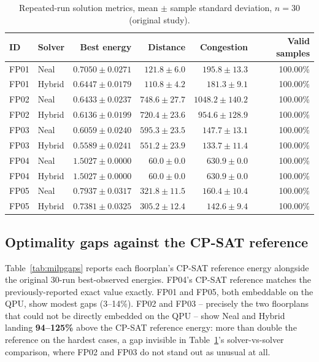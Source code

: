 \documentclass[11pt]{article}
\begin{document}
\begin{table}[h]
\centering
\caption{Repeated-run solution metrics, mean $\pm$ sample standard deviation, $n=30$ (original study).}
\label{tab:meanquality}
\small
\begin{tabular}{llrrrr}
\toprule
ID & Solver & Best energy & Distance & Congestion & Valid samples \\
\midrule
FP01 & Neal & $0.7050 \pm 0.0271$ & $121.8 \pm 6.0$ & $195.8 \pm 13.3$ & 100.00\% \\
FP01 & Hybrid & $0.6447 \pm 0.0179$ & $110.8 \pm 4.2$ & $181.3 \pm 9.1$ & 100.00\% \\
FP02 & Neal & $0.6433 \pm 0.0237$ & $748.6 \pm 27.7$ & $1048.2 \pm 140.2$ & 100.00\% \\
FP02 & Hybrid & $0.6136 \pm 0.0199$ & $720.4 \pm 23.6$ & $954.6 \pm 128.9$ & 100.00\% \\
FP03 & Neal & $0.6059 \pm 0.0240$ & $595.3 \pm 23.5$ & $147.7 \pm 13.1$ & 100.00\% \\
FP03 & Hybrid & $0.5589 \pm 0.0241$ & $551.2 \pm 23.9$ & $133.7 \pm 11.4$ & 100.00\% \\
FP04 & Neal & $1.5027 \pm 0.0000$ & $60.0 \pm 0.0$ & $630.9 \pm 0.0$ & 100.00\% \\
FP04 & Hybrid & $1.5027 \pm 0.0000$ & $60.0 \pm 0.0$ & $630.9 \pm 0.0$ & 100.00\% \\
FP05 & Neal & $0.7937 \pm 0.0317$ & $321.8 \pm 11.5$ & $160.4 \pm 10.4$ & 100.00\% \\
FP05 & Hybrid & $0.7381 \pm 0.0325$ & $305.2 \pm 12.4$ & $142.6 \pm 9.4$ & 100.00\% \\
\bottomrule
\end{tabular}
\end{table}

\subsection{Optimality gaps against the CP-SAT reference}
\label{sec:gaps}
Table~\ref{tab:milpgaps} reports each floorplan's CP-SAT reference energy alongside the original 30-run best-observed energies. FP04's CP-SAT reference matches the previously-reported exact value exactly. FP01 and FP05, both embeddable on the QPU, show modest gaps (3--14\%). FP02 and FP03 -- precisely the two floorplans that could not be directly embedded on the QPU -- show Neal and Hybrid landing \textbf{94--125\%} above the CP-SAT reference energy: more than double the reference on the hardest cases, a gap invisible in Table~\ref{tab:meanquality}'s solver-vs-solver comparison, where FP02 and FP03 do not stand out as unusual at all.
\end{document}
